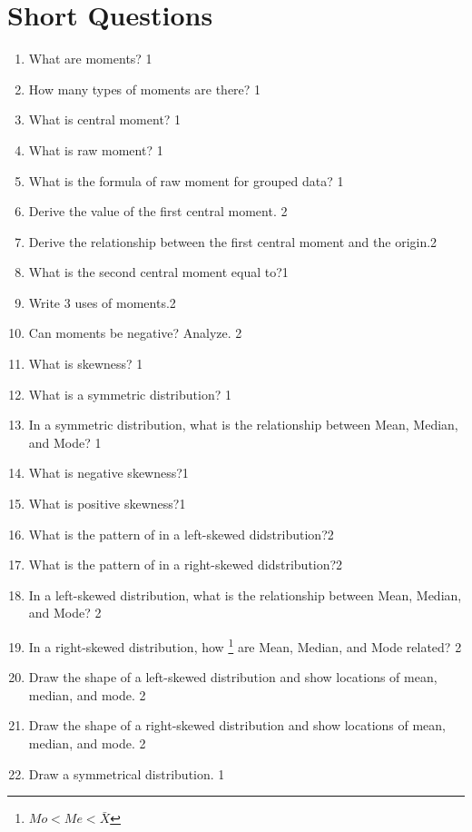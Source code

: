 \documentclass[a4paper,oneside]{book}
\begin{document}
\section{Short Questions}
\begin{enumerate}
    \item What are moments? \hfill 1
    \item How many types of moments are there?  \hfill 1
    \item What is central moment? \hfill 1
    \item  What is raw moment? \hfill 1
    \item  What is the formula of raw moment for grouped data? \hfill 1
    \item Derive the value of the first central moment. \hfill 2
    \item  Derive the relationship between the first central moment and the origin.\hfill 2
    \item What is the second central moment equal to?\hfill 1
    \item Write 3 uses of moments.\hfill 2
    \item Can moments be negative? Analyze. \hfill 2
    \item What is skewness? \hfill 1
    \item What is a symmetric distribution? \hfill 1
    \item In a symmetric distribution, what is the relationship between Mean, Median, and Mode? \hfill 1
    \item What is negative skewness?\hfill 1
    \item What is positive skewness?\hfill 1
    \item What is the pattern of in a left-skewed didstribution?\hfill 2
    \item What is the pattern of in a right-skewed didstribution?\hfill 2
    \item In a left-skewed distribution, what is the relationship between Mean, Median, and Mode? \hfill 2
    \item In a right-skewed distribution, how \footnote{$Mo < Me < \bar X$} are Mean, Median, and Mode related?  \hfill 2
    \item Draw the shape of a left-skewed distribution and show locations of mean, median, and mode.  \hfill 2
    \item Draw the shape of a right-skewed distribution and show locations of mean, median, and mode.  \hfill 2
    \item Draw a symmetrical distribution.   \hfill 1

\end{enumerate}
\end{document}
